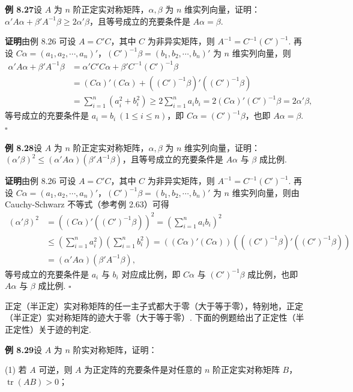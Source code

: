 \documentclass[UTF8, 12pt, fontset=fandol, oneside]{ctexart}
\begin{document}
\noindent\textbf{例 8.27}\quad 设 $A$ 为 $n$ 阶正定实对称矩阵，$\alpha,\beta$ 为 $n$ 维实列向量，证明：$\alpha'A\alpha+\beta'A^{-1}\beta\ge 2\alpha'\beta$，且等号成立的充要条件是 $A\alpha=\beta$.

\noindent\textbf{证明}\quad 由例 8.26 可设 $A=C'C$，其中 $C$ 为非异实矩阵，则 $A^{-1}=C^{-1}(C')^{-1}$. 再设 $C\alpha=(a_1,a_2,\cdots,a_n)'$，$(C')^{-1}\beta=(b_1,b_2,\cdots,b_n)'$ 为 $n$ 维实列向量，则
\[
\begin{aligned}
\alpha'A\alpha+\beta'A^{-1}\beta
&=\alpha'C'C\alpha+\beta'C^{-1}(C')^{-1}\beta\\
&=(C\alpha)'(C\alpha)+((C')^{-1}\beta)'((C')^{-1}\beta)\\
&=\sum_{i=1}^n(a_i^2+b_i^2)\ge 2\sum_{i=1}^n a_ib_i
=2(C\alpha)'(C')^{-1}\beta=2\alpha'\beta,
\end{aligned}
\]
等号成立的充要条件是 $a_i=b_i\ (1\le i\le n)$，即 $C\alpha=(C')^{-1}\beta$，也即 $A\alpha=\beta$. $\ensuremath{\square}$

\noindent\textbf{例 8.28}\quad 设 $A$ 为 $n$ 阶正定实对称矩阵，$\alpha,\beta$ 为 $n$ 维实列向量，证明：$(\alpha'\beta)^2\le (\alpha'A\alpha)(\beta'A^{-1}\beta)$，且等号成立的充要条件是 $A\alpha$ 与 $\beta$ 成比例.

\noindent\textbf{证明}\quad 由例 8.26 可设 $A=C'C$，其中 $C$ 为非异实矩阵，则 $A^{-1}=C^{-1}(C')^{-1}$. 再设 $C\alpha=(a_1,a_2,\cdots,a_n)'$，$(C')^{-1}\beta=(b_1,b_2,\cdots,b_n)'$ 为 $n$ 维实列向量，则由 Cauchy-Schwarz 不等式（参考例 2.63）可得
\[
\begin{aligned}
(\alpha'\beta)^2
&=\left((C\alpha)'((C')^{-1}\beta)\right)^2
=\left(\sum_{i=1}^n a_ib_i\right)^2\\
&\le \left(\sum_{i=1}^n a_i^2\right)\left(\sum_{i=1}^n b_i^2\right)
=\left((C\alpha)'(C\alpha)\right)\left(((C')^{-1}\beta)'((C')^{-1}\beta)\right)\\
&=(\alpha'A\alpha)(\beta'A^{-1}\beta),
\end{aligned}
\]
等号成立的充要条件是 $a_i$ 与 $b_i$ 对应成比例，即 $C\alpha$ 与 $(C')^{-1}\beta$ 成比例，也即 $A\alpha$ 与 $\beta$ 成比例. $\ensuremath{\square}$

正定（半正定）实对称矩阵的任一主子式都大于零（大于等于零），特别地，正定（半正定）实对称矩阵的迹大于零（大于等于零）. 下面的例题给出了正定性（半正定性）关于迹的判定.

\noindent\textbf{例 8.29}\quad 设 $A$ 为 $n$ 阶实对称矩阵，证明：

(1) 若 $A$ 可逆，则 $A$ 为正定阵的充要条件是对任意的 $n$ 阶正定实对称矩阵 $B$，$\operatorname{tr}(AB)>0$；
\end{document}
